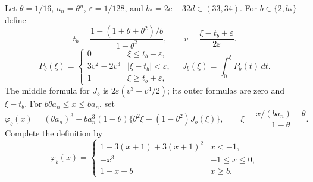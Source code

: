 Let $\theta=1/16$, $a_n=\theta^n$, $\varepsilon=1/128$, and
$b_*=2c-32d\in(33,34)$. For $b\in\{2,b_*\}$ define
\[
 t_b=\frac{1-(1+\theta+\theta^2)/b}{1-\theta^2},\qquad
 v=\frac{\xi-t_b+\varepsilon}{2\varepsilon}.
\]
\[
 P_b(\xi)=
 \begin{cases}
 0&\xi\le t_b-\varepsilon,\\
 3v^2-2v^3&|\xi-t_b|<\varepsilon,\\
 1&\xi\ge t_b+\varepsilon,
 \end{cases}
 \quad J_b(\xi)=\int_0^\xi P_b(t)\,dt.
\]
The middle formula for $J_b$ is $2\varepsilon(v^3-v^4/2)$; its outer
formulas are zero and $\xi-t_b$. For
$b\theta a_n\le x\le ba_n$, set
\begin{equation}\label{art:upper_scalar}
 \varphi_b(x)=(\theta a_n)^3+
 ba_n^3(1-\theta)
 \{\theta^2\xi+(1-\theta^2)J_b(\xi)\},\qquad
 \xi=\frac{x/(ba_n)-\theta}{1-\theta}.
\end{equation}
Complete the definition by
\[
 \varphi_b(x)=
 \begin{cases}
 1-3(x+1)+3(x+1)^2&x<-1,\\
 -x^3&-1\le x\le0,\\
 1+x-b&x\ge b.
 \end{cases}
\]

